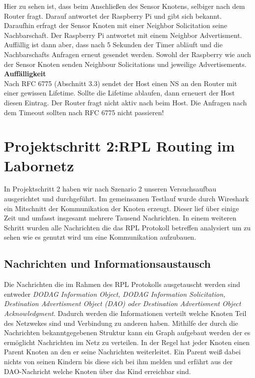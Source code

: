 \documentclass[]{scrartcl}
\begin{document}
Hier zu sehen ist, dass beim Anschließen des Sensor Knotens, selbiger nach dem Router fragt. Darauf antwortet der Raspberry Pi und gibt sich bekannt. Daraufhin erfragt der Sensor Knoten mit einer Neighbor Solicitation seine Nachbarschaft. Der Raspberry Pi antwortet mit einem Neighbor Advertisment. Auffällig ist dann aber, dass nach 5 Sekunden der Timer abläuft und die Nachbarschafts Anfragen erneut gesendet werden. Sowohl der Raspberry wie auch der Sensor Knoten senden Neighbour Solicitations und jeweilige Advertisements.\\

\textbf{Auffälligkeit}\\
Nach RFC 6775 (Abschnitt 3.3) sendet der Host einen NS an den Router mit einer gewissen Lifetime. Sollte die Lifetime ablaufen, dann erneuert der Host diesen Eintrag. Der Router fragt nicht aktiv nach beim Host. Die Anfragen nach dem Timeout sollten nach RFC 6775 nicht passieren!


\section{Projektschritt 2:RPL Routing im Labornetz}
In Projektschritt 2 haben wir nach Szenario 2 unseren Versuchsaufbau ausgerichtet und durchgeführt. Im gemeinsamen Testlauf wurde durch Wireshark ein Mitschnitt der Kommunikation der Knoten erzeugt. Dieser lief über einige Zeit und umfasst insgesamt mehrere Tausend Nachrichten. In einem weiteren Schritt wurden alle Nachrichten die das RPL Protokoll betreffen analysiert um zu sehen wie es genutzt wird um eine Kommunikation aufzubauen. 

\subsection{Nachrichten und Informationsaustausch}
Die Nachrichten die im Rahmen des RPL Protokolls ausgetauscht werden sind entweder \textit{DODAG Information Object, DODAG Information Solicitation, Destination Advertisment Object (DAO) oder Destination Advertisment Object Acknowledgment}. Dadurch werden die Informationen verteilt welche Knoten Teil des Netzwekes sind und Verbindung zu anderen haben. Mithilfe der durch die Nachrichten bekanntgegebenen Struktur kann ein Graph aufgebaut werden der es ermöglicht Nachrichten im Netz zu verteilen. In der Regel hat jeder Knoten einen Parent Knoten an den er seine Nachrichten weiterleitet. Ein Parent weiß dabei nichts von seinen Kindern bis diese sich bei ihm melden und erfährt aus der DAO-Nachricht welche Knoten über das Kind erreichbar sind.
\end{document}

